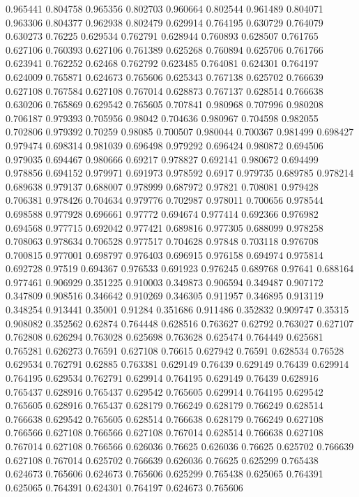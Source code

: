 0.965441 0.804758
0.965356 0.802703
0.960664 0.802544
0.961489 0.804071
0.963306 0.804377
0.962938 0.802479
0.629914 0.764195
0.630729 0.764079
0.630273 0.76225
0.629534 0.762791
0.628944 0.760893
0.628507 0.761765
0.627106 0.760393
0.627106 0.761389
0.625268 0.760894
0.625706 0.761766
0.623941 0.762252
0.62468 0.762792
0.623485 0.764081
0.624301 0.764197
0.624009 0.765871
0.624673 0.765606
0.625343 0.767138
0.625702 0.766639
0.627108 0.767584
0.627108 0.767014
0.628873 0.767137
0.628514 0.766638
0.630206 0.765869
0.629542 0.765605
0.707841 0.980968
0.707996 0.980208
0.706187 0.979393
0.705956 0.98042
0.704636 0.980967
0.704598 0.982055
0.702806 0.979392
0.70259 0.98085
0.700507 0.980044
0.700367 0.981499
0.698427 0.979474
0.698314 0.981039
0.696498 0.979292
0.696424 0.980872
0.694506 0.979035
0.694467 0.980666
0.69217 0.978827
0.692141 0.980672
0.694499 0.978856
0.694152 0.979971
0.691973 0.978592
0.6917 0.979735
0.689785 0.978214
0.689638 0.979137
0.688007 0.978999
0.687972 0.97821
0.708081 0.979428
0.706381 0.978426
0.704634 0.979776
0.702987 0.978011
0.700656 0.978544
0.698588 0.977928
0.696661 0.97772
0.694674 0.977414
0.692366 0.976982
0.694568 0.977715
0.692042 0.977421
0.689816 0.977305
0.688099 0.978258
0.708063 0.978634
0.706528 0.977517
0.704628 0.97848
0.703118 0.976708
0.700815 0.977001
0.698797 0.976403
0.696915 0.976158
0.694974 0.975814
0.692728 0.97519
0.694367 0.976533
0.691923 0.976245
0.689768 0.97641
0.688164 0.977461
0.906929 0.351225
0.910003 0.349873
0.906594 0.349487
0.907172 0.347809
0.908516 0.346642
0.910269 0.346305
0.911957 0.346895
0.913119 0.348254
0.913441 0.35001
0.91284 0.351686
0.911486 0.352832
0.909747 0.35315
0.908082 0.352562
0.62874 0.764448
0.628516 0.763627
0.62792 0.763027
0.627107 0.762808
0.626294 0.763028
0.625698 0.763628
0.625474 0.764449
0.625681 0.765281
0.626273 0.76591
0.627108 0.76615
0.627942 0.76591
0.628534 0.76528
0.629534 0.762791
0.62885 0.763381
0.629149 0.76439
0.629149 0.76439
0.629914 0.764195
0.629534 0.762791
0.629914 0.764195
0.629149 0.76439
0.628916 0.765437
0.628916 0.765437
0.629542 0.765605
0.629914 0.764195
0.629542 0.765605
0.628916 0.765437
0.628179 0.766249
0.628179 0.766249
0.628514 0.766638
0.629542 0.765605
0.628514 0.766638
0.628179 0.766249
0.627108 0.766566
0.627108 0.766566
0.627108 0.767014
0.628514 0.766638
0.627108 0.767014
0.627108 0.766566
0.626036 0.76625
0.626036 0.76625
0.625702 0.766639
0.627108 0.767014
0.625702 0.766639
0.626036 0.76625
0.625299 0.765438
0.624673 0.765606
0.624673 0.765606
0.625299 0.765438
0.625065 0.764391
0.625065 0.764391
0.624301 0.764197
0.624673 0.765606
